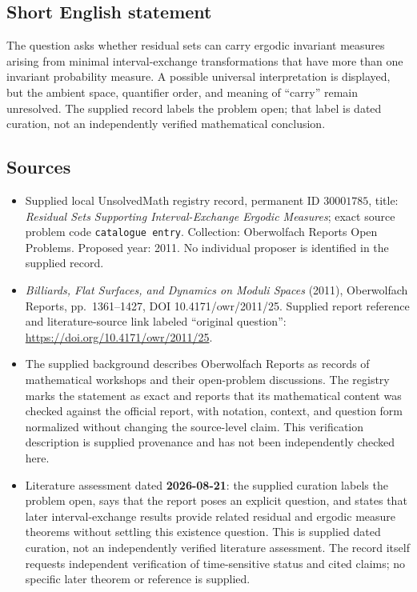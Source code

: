 \documentclass[11pt]{article}
\begin{document}
\subsection{Short English statement}
The question asks whether residual sets can carry ergodic invariant measures arising from minimal interval-exchange transformations that have more than one invariant probability measure. A possible universal interpretation is displayed, but the ambient space, quantifier order, and meaning of ``carry'' remain unresolved. The supplied record labels the problem open; that label is dated curation, not an independently verified mathematical conclusion.
\subsection{Sources}
\begin{itemize}
\item Supplied local UnsolvedMath registry record, permanent ID \(30001785\), title: \emph{Residual Sets Supporting Interval-Exchange Ergodic Measures}; exact source problem code \texttt{catalogue entry}. Collection: Oberwolfach Reports Open Problems. Proposed year: 2011. No individual proposer is identified in the supplied record.
\item \emph{Billiards, Flat Surfaces, and Dynamics on Moduli Spaces} (2011), Oberwolfach Reports, pp.\ 1361--1427, DOI 10.4171/owr/2011/25. Supplied report reference and literature-source link labeled ``original question'': \url{https://doi.org/10.4171/owr/2011/25}.
\item The supplied background describes Oberwolfach Reports as records of mathematical workshops and their open-problem discussions. The registry marks the statement as exact and reports that its mathematical content was checked against the official report, with notation, context, and question form normalized without changing the source-level claim. This verification description is supplied provenance and has not been independently checked here.
\item Literature assessment dated \textbf{2026-08-21}: the supplied curation labels the problem open, says that the report poses an explicit question, and states that later interval-exchange results provide related residual and ergodic measure theorems without settling this existence question. This is supplied dated curation, not an independently verified literature assessment. The record itself requests independent verification of time-sensitive status and cited claims; no specific later theorem or reference is supplied.
\end{itemize}
\end{document}
